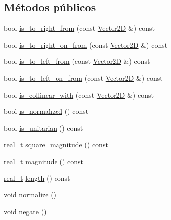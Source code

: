 \subsection*{Métodos públicos}
\begin{DoxyCompactItemize}
\item 
bool \hyperlink{class_designar_1_1_vector2_d_aaf996e3b7ab3c95749a7c047a9e93d58}{is\+\_\+to\+\_\+right\+\_\+from} (const \hyperlink{class_designar_1_1_vector2_d}{Vector2D} \&) const
\item 
bool \hyperlink{class_designar_1_1_vector2_d_ae3db7e1f1be95eb1cfb3647fa181bb9a}{is\+\_\+to\+\_\+right\+\_\+on\+\_\+from} (const \hyperlink{class_designar_1_1_vector2_d}{Vector2D} \&) const
\item 
bool \hyperlink{class_designar_1_1_vector2_d_a5926133a159fe438adb61f7231443aec}{is\+\_\+to\+\_\+left\+\_\+from} (const \hyperlink{class_designar_1_1_vector2_d}{Vector2D} \&) const
\item 
bool \hyperlink{class_designar_1_1_vector2_d_a90c14cf337fa288a68d5884716de125e}{is\+\_\+to\+\_\+left\+\_\+on\+\_\+from} (const \hyperlink{class_designar_1_1_vector2_d}{Vector2D} \&) const
\item 
bool \hyperlink{class_designar_1_1_vector2_d_a70660ef72aa64cf53c66dd15717680f5}{is\+\_\+collinear\+\_\+with} (const \hyperlink{class_designar_1_1_vector2_d}{Vector2D} \&) const
\item 
bool \hyperlink{class_designar_1_1_vector2_d_ace8e5848fe3eb87532827c7ffdef38fd}{is\+\_\+normalized} () const
\item 
bool \hyperlink{class_designar_1_1_vector2_d_af33b3e2db984c1e79ae87b17bca170dc}{is\+\_\+unitarian} () const
\item 
\hyperlink{namespace_designar_aca2c32af26808dbec1f3a3071fad25ce}{real\+\_\+t} \hyperlink{class_designar_1_1_vector2_d_a2a95d3767f9c5bde2d8a3e6c8074ff7a}{square\+\_\+magnitude} () const
\item 
\hyperlink{namespace_designar_aca2c32af26808dbec1f3a3071fad25ce}{real\+\_\+t} \hyperlink{class_designar_1_1_vector2_d_aa412a05af3021e3b1d942921aa6a15d0}{magnitude} () const
\item 
\hyperlink{namespace_designar_aca2c32af26808dbec1f3a3071fad25ce}{real\+\_\+t} \hyperlink{class_designar_1_1_vector2_d_a3bfec04055e111cf81be2e3244cb7125}{length} () const
\item 
void \hyperlink{class_designar_1_1_vector2_d_ac504a8cec82e7183bd0105e83942fd67}{normalize} ()
\item 
void \hyperlink{class_designar_1_1_vector2_d_a209bedef7a754a768fc3be0e8b97d2b8}{negate} ()

\end{DoxyCompactItemize}
